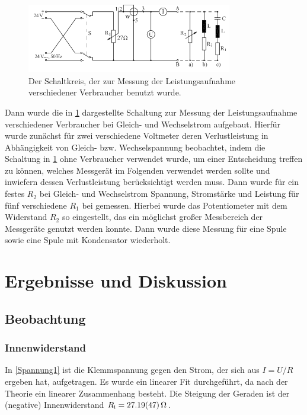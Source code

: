 \documentclass[
	a4paper,
	12pt,
	pagesize,
	ngerman
]{scrartcl}
\begin{document}
	\begin{figure}[tb]
		\includegraphics[width=0.8\textwidth]{Schaltkreis2}
		\centering
		\caption{Der Schaltkreis, der zur Messung der Leistungsaufnahme verschiedener Verbraucher benutzt wurde.}
		\label{SK2}
		\centering
	\end{figure}
	
	Dann wurde die in \cref{SK2} dargestellte Schaltung zur Messung der Leistungsaufnahme verschiedener Verbraucher bei Gleich- und Wechselstrom aufgebaut.
	Hierfür wurde zunächst für zwei verschiedene Voltmeter deren Verlustleistung in Abhängigkeit von Gleich- bzw. Wechselspannung beobachtet, indem die Schaltung in \cref{SK2} ohne Verbraucher verwendet wurde, um einer Entscheidung treffen zu können, welches Messgerät im Folgenden verwendet werden sollte und inwiefern dessen Verlustleistung berücksichtigt werden muss.
	Dann wurde für ein festes $ R_2 $ bei Gleich- und Wechselstrom Spannung, Stromstärke und Leistung für fünf verschiedene $ R_1 $ bei gemessen.
	Hierbei wurde das Potentiometer mit dem Widerstand $ R_2 $ so eingestellt, das ein möglichst großer Messbereich der Messgeräte genutzt werden konnte.
	Dann wurde diese Messung für eine Spule sowie eine Spule mit Kondensator wiederholt. 
	
	\section{Ergebnisse und Diskussion}
	\subsection{Beobachtung}
	\subsubsection{Innenwiderstand}
	In \cref{Spannung1} ist die Klemmspannung gegen den Strom, der sich aus $I = U/R$ ergeben hat, aufgetragen. 
	Es wurde ein linearer Fit durchgeführt, da nach der Theorie ein linearer Zusammenhang besteht. 
	Die Steigung der Geraden ist der (negative) Innenwiderstand $R_\text{i} = \SI{27,19 \pm 0,47}{\Omega}$.
\end{document}
